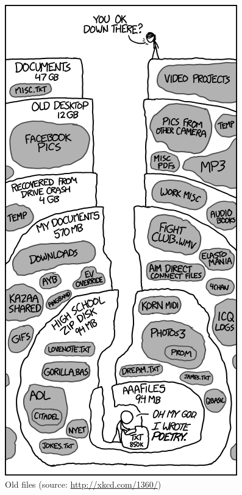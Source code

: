 \documentclass[12pt,letterpaper]{article}
\begin{document}
\begin{figure}[!h]
	\centering
	\includegraphics[width=0.5\linewidth]{figs/xkcd_old_files}
	\caption{Old files (source: \url{http://xkcd.com/1360/})}
	\label{fig:old_figs}
\end{figure}
\end{document}
